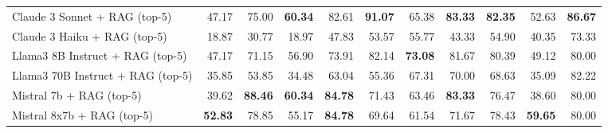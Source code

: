 \begin{table}[H]
{\begin{tabular}{lrrrrrrrrrr}
\rowcolor{Gray}
Claude 3 Sonnet + RAG (top-5) & 47.17 & 75.00 & \textbf{60.34} & 82.61 & \textbf{91.07} & 65.38 & \textbf{83.33} & \textbf{82.35} & 52.63 & \textbf{86.67} \\
\rowcolor{Gray}
Claude 3 Haiku + RAG (top-5) & 18.87 & 30.77 & 18.97 & 47.83 & 53.57 & 55.77 & 43.33 & 54.90 & 40.35 & 73.33 \\
\rowcolor{Gray}
Llama3 8B Instruct + RAG (top-5) & 47.17 & 71.15 & 56.90 & 73.91 & 82.14 & \textbf{73.08} & 81.67 & 80.39 & 49.12 & 80.00 \\
\rowcolor{Gray}
Llama3 70B Instruct + RAG (top-5) & 35.85 & 53.85 & 34.48 & 63.04 & 55.36 & 67.31 & 70.00 & 68.63 & 35.09 & 82.22 \\
\rowcolor{Gray}
Mistral 7b + RAG (top-5) & 39.62 & \textbf{88.46} & \textbf{60.34} & \textbf{84.78} & 71.43 & 63.46 & \textbf{83.33} & 76.47 & 38.60 & 80.00 \\
\rowcolor{Gray}
Mistral 8x7b + RAG (top-5) & \textbf{52.83} & 78.85 & 55.17 & \textbf{84.78} & 69.64 & 61.54 & 71.67 & 78.43 & \textbf{59.65} & 80.00 \\
\bottomrule
\end{tabular}
}

\vspace{2mm}



\end{table}
